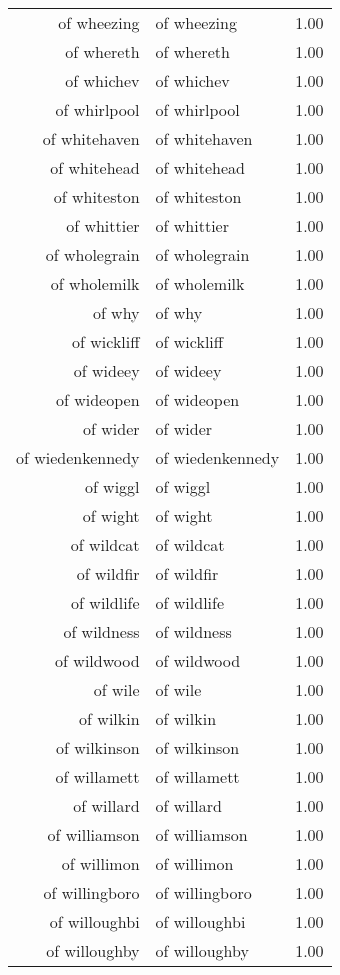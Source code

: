 \begin{table}[ht]
\begin{tabular}{rlr}
  of wheezing & of wheezing & 1.00 \\ 
  of whereth & of whereth & 1.00 \\ 
  of whichev & of whichev & 1.00 \\ 
  of whirlpool & of whirlpool & 1.00 \\ 
  of whitehaven & of whitehaven & 1.00 \\ 
  of whitehead & of whitehead & 1.00 \\ 
  of whiteston & of whiteston & 1.00 \\ 
  of whittier & of whittier & 1.00 \\ 
  of wholegrain & of wholegrain & 1.00 \\ 
  of wholemilk & of wholemilk & 1.00 \\ 
  of why & of why & 1.00 \\ 
  of wickliff & of wickliff & 1.00 \\ 
  of wideey & of wideey & 1.00 \\ 
  of wideopen & of wideopen & 1.00 \\ 
  of wider & of wider & 1.00 \\ 
  of wiedenkennedy & of wiedenkennedy & 1.00 \\ 
  of wiggl & of wiggl & 1.00 \\ 
  of wight & of wight & 1.00 \\ 
  of wildcat & of wildcat & 1.00 \\ 
  of wildfir & of wildfir & 1.00 \\ 
  of wildlife & of wildlife & 1.00 \\ 
  of wildness & of wildness & 1.00 \\ 
  of wildwood & of wildwood & 1.00 \\ 
  of wile & of wile & 1.00 \\ 
  of wilkin & of wilkin & 1.00 \\ 
  of wilkinson & of wilkinson & 1.00 \\ 
  of willamett & of willamett & 1.00 \\ 
  of willard & of willard & 1.00 \\ 
  of williamson & of williamson & 1.00 \\ 
  of willimon & of willimon & 1.00 \\ 
  of willingboro & of willingboro & 1.00 \\ 
  of willoughbi & of willoughbi & 1.00 \\ 
  of willoughby & of willoughby & 1.00 \\ 

\end{tabular}
\end{table}
